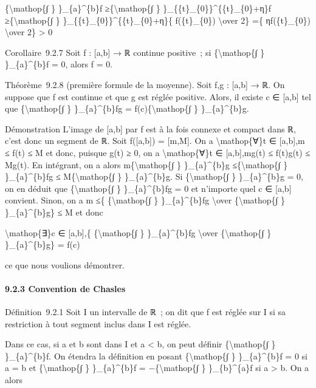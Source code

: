 \documentclass[]{article}
\begin{document}
\{\textbackslash{}mathop\{∫ \} \}\_\{a\}\^{}\{b\}f
≥\{\textbackslash{}mathop\{∫ \}
\}\_\{\{t\}\_\{0\}\}\^{}\{\{t\}\_\{0\}+η\}f ≥\{\textbackslash{}mathop\{∫
\} \}\_\{\{t\}\_\{0\}\}\^{}\{\{t\}\_\{0\}+η\}\{ f(\{t\}\_\{0\})
\textbackslash{}over 2\} =\{ ηf(\{t\}\_\{0\}) \textbackslash{}over 2\}
\textgreater{} 0

Corollaire~9.2.7 Soit f : {[}a,b{]} → ℝ continue positive~; si
\{\textbackslash{}mathop\{∫ \} \}\_\{a\}\^{}\{b\}f = 0, alors f = 0.

Théorème~9.2.8 (première formule de la moyenne). Soit f,g : {[}a,b{]} →
ℝ. On suppose que f est continue et que g est réglée positive. Alors, il
existe c ∈ {[}a,b{]} tel que \{\textbackslash{}mathop\{∫ \}
\}\_\{a\}\^{}\{b\}fg = f(c)\{\textbackslash{}mathop\{∫ \}
\}\_\{a\}\^{}\{b\}g.

Démonstration L'image de {[}a,b{]} par f est à la fois connexe et
compact dans ℝ, c'est donc un segment de ℝ. Soit f({[}a,b{]}) =
{[}m,M{]}. On a \textbackslash{}mathop\{∀\}t ∈ {[}a,b{]},m ≤ f(t) ≤ M et
donc, puisque g(t) ≥ 0, on a \textbackslash{}mathop\{∀\}t ∈
{[}a,b{]},mg(t) ≤ f(t)g(t) ≤ Mg(t). En intégrant, on a alors
m\{\textbackslash{}mathop\{∫ \} \}\_\{a\}\^{}\{b\}g
≤\{\textbackslash{}mathop\{∫ \} \}\_\{a\}\^{}\{b\}fg ≤
M\{\textbackslash{}mathop\{∫ \} \}\_\{a\}\^{}\{b\}g. Si
\{\textbackslash{}mathop\{∫ \} \}\_\{a\}\^{}\{b\}g = 0, on en déduit que
\{\textbackslash{}mathop\{∫ \} \}\_\{a\}\^{}\{b\}fg = 0 et n'importe
quel c ∈ {[}a,b{]} convient. Sinon, on a m ≤\{
\{\textbackslash{}mathop\{∫ \} \}\_\{a\}\^{}\{b\}fg \textbackslash{}over
\{\textbackslash{}mathop\{∫ \} \}\_\{a\}\^{}\{b\}g\} ≤ M et donc

\textbackslash{}mathop\{∃\}c ∈ {[}a,b{]},\{ \{\textbackslash{}mathop\{∫
\} \}\_\{a\}\^{}\{b\}fg \textbackslash{}over \{\textbackslash{}mathop\{∫
\} \}\_\{a\}\^{}\{b\}g\} = f(c)

ce que nous voulions démontrer.

\paragraph{9.2.3 Convention de Chasles}

Définition~9.2.1 Soit I un intervalle de ℝ~; on dit que f est réglée sur
I si sa restriction à tout segment inclus dans I est réglée.

Dans ce cas, si a et b sont dans I et a \textless{} b, on peut définir
\{\textbackslash{}mathop\{∫ \} \}\_\{a\}\^{}\{b\}f. On étendra la
définition en posant \{\textbackslash{}mathop\{∫ \} \}\_\{a\}\^{}\{b\}f
= 0 si a = b et \{\textbackslash{}mathop\{∫ \} \}\_\{a\}\^{}\{b\}f =
−\{\textbackslash{}mathop\{∫ \} \}\_\{b\}\^{}\{a\}f si a \textgreater{}
b. On a alors
\end{document}
